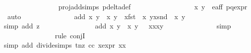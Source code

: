 \begin{isabellebody}
\ \ \ \ \ \ \ \ \ \ \ \ \ \ \isamarkupfalse%
\ proj{\isacharunderscore}add{\isachardot}simps\ p{\isacharunderscore}delta{\isacharunderscore}def\ \isanewline
\ \ \ \ \ \ \ \ \ \ \ \ \ \ \isamarkupfalse%
\ {\isacartoucheopen}{\isasymtau}\ {\isacharparenleft}x{\isacharprime}{\isacharcomma}\ y{\isacharprime}{\isacharparenright}\ {\isasymin}\ e{\isacharunderscore}aff{\isacartoucheclose}\ p{\isacharunderscore}q{\isacharunderscore}expr{\isacharparenleft}{}{\isacharparenright}\ \isamarkupfalse%
\ auto\ \isanewline
\ \ \ \ \ \ \ \ \ \ \ \ \isamarkupfalse%
\ {\isachardoublequoteopen}add\ {\isacharparenleft}x{\isacharcomma}\ y{\isacharparenright}\ {\isacharparenleft}{\isasymtau}\ {\isacharparenleft}x{\isacharprime}{\isacharcomma}\ y{\isacharprime}{\isacharparenright}{\isacharparenright}\ {\isacharequal}\ {\isacharparenleft}x{\isacharasterisk}{\isacharparenleft}fst\ {\isacharparenleft}{\isasymtau}\ {\isacharparenleft}x{\isacharprime}{\isacharcomma}\ y{\isacharprime}{\isacharparenright}{\isacharparenright}{\isacharparenright}{\isacharcomma}x{\isacharasterisk}{\isacharparenleft}snd\ {\isacharparenleft}{\isasymtau}\ {\isacharparenleft}x{\isacharprime}{\isacharcomma}\ y{\isacharprime}{\isacharparenright}{\isacharparenright}{\isacharparenright}{\isacharparenright}{\isachardoublequoteclose}\isanewline
\ \ \ \ \ \ \ \ \ \ \ \ \ \ \isamarkupfalse%
{\isacharparenleft}simp\ add{\isacharcolon}\ z{}{\isacharparenright}\isanewline
\ \ \ \ \ \ \ \ \ \ \ \ \isamarkupfalse%
\ \isamarkupfalse%
\ {\isachardoublequoteopen}add\ {\isacharparenleft}x{\isacharcomma}\ y{\isacharparenright}\ {\isacharparenleft}{\isasymtau}\ {\isacharparenleft}x{\isacharprime}{\isacharcomma}\ y{\isacharprime}{\isacharparenright}{\isacharparenright}\ {\isacharequal}\ {\isasymtau}\ {\isacharparenleft}x{\isacharasterisk}x{\isacharprime}{\isacharcomma}x{\isacharasterisk}y{\isacharprime}{\isacharparenright}{\isachardoublequoteclose}\isanewline
\ \ \ \ \ \ \ \ \ \ \ \ \ \ \isamarkupfalse%
{\isacharparenleft}simp{\isacharparenright}\isanewline
\ \ \ \ \ \ \ \ \ \ \ \ \ \ \isamarkupfalse%
{\isacharparenleft}rule\ conjI{\isacharparenright}\isanewline
\ \ \ \ \ \ \ \ \ \ \ \ \ \ \isamarkupfalse%
{\isacharparenleft}simp\ add{\isacharcolon}\ divide{\isacharunderscore}simps\ t{\isacharunderscore}nz\ cc\ x{\isacharunderscore}expr\ {\isacartoucheopen}x{\isacharasterisk}x\ {\isacharequal}\ {}{\isacartoucheclose}{\isacharparenright}{\isacharplus}\isanewline

\end{isabellebody}
